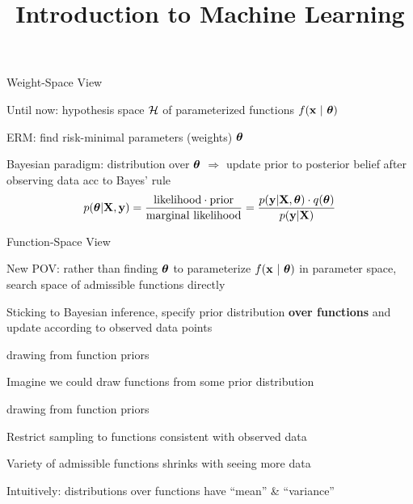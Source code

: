 \documentclass[11pt,compress,t,notes=noshow, xcolor=table]{beamer}
\title{Introduction to Machine Learning}
\begin{document}

\begin{framei}[sep=L]{Weight-Space View}
\item Until now: hypothesis space $\mathcal{H}$ of parameterized functions $f(\mathbf{x} ~|~ \bm{\theta})$ %
\item ERM: find risk-minimal parameters (weights) $\bm{\theta}$
\item Bayesian paradigm: distribution over $\bm{\theta}$ $\Rightarrow$ update prior to posterior belief after observing data acc to Bayes' rule
$$
p(\bm{\theta} | \mathbf{X}, \mathbf{y}) 
= \frac{\text{likelihood} \cdot \text{prior}}{\text{marginal likelihood}} 
= \frac{p(\mathbf{y} | \mathbf{X}, \bm{\theta}) \cdot q(\bm{\theta})}{p(\mathbf{y}|\mathbf{X})}
$$
\end{framei}

\begin{framei}[sep=L]{Function-Space View}
\item New POV: rather than finding $\bm{\theta}$ to parameterize $f(\mathbf{x} ~|~ \bm{\theta})$ in parameter space,  search space of admissible functions directly
\item Sticking to Bayesian inference, specify prior distribution \textbf{over functions} and update according to observed data points
\end{framei}

\begin{framei}{drawing from function priors}
\item Imagine we could draw functions from some prior distribution

\vfill

\end{framei}

\begin{framei}{drawing from function priors}
\item Restrict sampling to functions consistent with observed data
\vfill
{}
\vfill
{}
\item Variety of admissible functions shrinks with seeing more data
\item Intuitively: distributions over functions have ``mean'' \& ``variance''
\end{framei}
\end{document}
